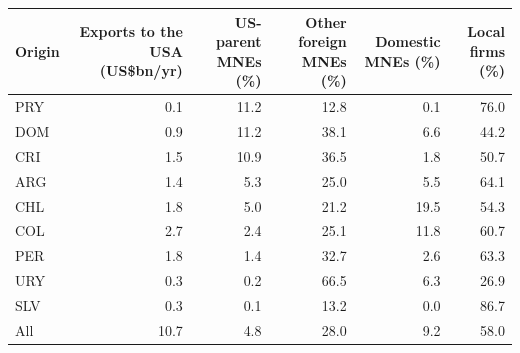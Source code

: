 \begin{tabular}{lrrrrr}
\toprule
Origin & Exports to the USA (US\$bn/yr) & US-parent MNEs (\%) & Other foreign MNEs (\%) & Domestic MNEs (\%) & Local firms (\%) \\
\midrule
PRY & 0.1 & 11.2 & 12.8 & 0.1 & 76.0 \\
DOM & 0.9 & 11.2 & 38.1 & 6.6 & 44.2 \\
CRI & 1.5 & 10.9 & 36.5 & 1.8 & 50.7 \\
ARG & 1.4 & 5.3 & 25.0 & 5.5 & 64.1 \\
CHL & 1.8 & 5.0 & 21.2 & 19.5 & 54.3 \\
COL & 2.7 & 2.4 & 25.1 & 11.8 & 60.7 \\
PER & 1.8 & 1.4 & 32.7 & 2.6 & 63.3 \\
URY & 0.3 & 0.2 & 66.5 & 6.3 & 26.9 \\
SLV & 0.3 & 0.1 & 13.2 & 0.0 & 86.7 \\
\midrule
All & 10.7 & 4.8 & 28.0 & 9.2 & 58.0 \\
\bottomrule
\end{tabular}
